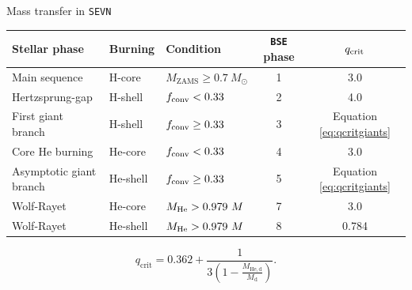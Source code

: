\documentclass{beamer} %
\begin{document}
\begin{frame}[noframenumbering]{Mass transfer in \texttt{SEVN}}
	\small
	\centering
	\\
	\scriptsize
	\bigskip
	\bigskip
	    \begin{tabular}{lllcc}
		\toprule
		Stellar phase & Burning &  Condition & \texttt{BSE} phase &  $q_{\rm crit}$ \\ 
		\midrule
		Main sequence           & H-core       & $M_{\text{ZAMS}} \geq 0.7~M_\odot$          &  1  & 3.0        \\
		Hertzsprung-gap         & H-shell    & $f_{\rm conv} < 0.33$       &  2  & 4.0        \\
		First giant branch      & H-shell    & $f_{\rm conv} \geq 0.33$    &  3  & Equation \ref{eq:qcritgiants} \\
		Core He burning         & He-core     & $f_{\rm conv} < 0.33$       &  4  & 3.0 \\ 
		Asymptotic giant branch & He-shell    & $f_{\rm conv} \geq 0.33$    &  5  & Equation \ref{eq:qcritgiants} \\
		\hline
		Wolf-Rayet              & He-core     & $M_{\rm He} > 0.979~M$  &  7  & 3.0 \\ 
		Wolf-Rayet              & He-shell   & $M_{\rm He} > 0.979~M$  &  8  & 0.784 \\ 
		\bottomrule
	\end{tabular}
\bigskip
\bigskip
\begin{equation}\label{eq:qcritgiants}
q_\mathrm{crit} = 0.362 + \frac{1}{3\left(1-\frac{M_\mathrm{He,d}}{M_\mathrm{d}}\right)}.
\end{equation}
\end{frame}
\end{document}
